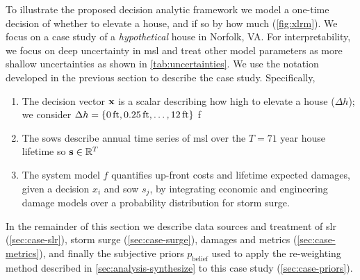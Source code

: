 \documentclass[11pt]{article}
\begin{document}
To illustrate the proposed decision analytic framework we model a one-time decision of whether to elevate a house, and if so by how much (\cref{fig:xlrm}).
We focus on a case study of a \emph{hypothetical} house in Norfolk, VA.
For interpretability, we focus on deep uncertainty in \gls{msl} and treat other model parameters as more shallow uncertainties as shown in \cref{tab:uncertainties}.
We use the notation developed in the previous section to describe the case study.
Specifically,
\begin{enumerate}
    \item The decision vector $\vb{x}$ is a scalar describing how high to elevate a house ($\Delta h$); we consider $\Delta h = \qty{\SI{0}{ft}, \SI{0.25}{ft}, \ldots, \SI{12}{ft}}$ f
    \item The \glspl{sow} describe annual time series of \gls{msl} over the $T=71$ year house lifetime so $\vb{s} \in \mathbb{R}^T$
    \item The system model $f$ quantifies up-front costs and lifetime expected damages, given a decision $x_i$ and \gls{sow} $s_j$, by integrating economic and engineering damage models over a probability distribution for storm surge.
\end{enumerate}
In the remainder of this section we describe data sources and treatment of \gls{slr} (\cref{sec:case-slr}), storm surge (\cref{sec:case-surge}), damages and metrics (\cref{sec:case-metrics}), and finally the subjective priors $p_\mathrm{belief}$ used to apply the re-weighting method described in \cref{sec:analysis-synthesize} to this case study (\cref{sec:case-priors}).
\end{document}
